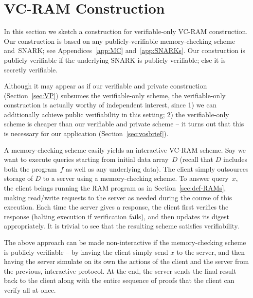 \section{VC-RAM Construction}
\label{sec:verifiableonly}
In this section we sketch a construction for verifiable-only VC-RAM construction.
Our construction is based on any publicly-verifiable memory-checking scheme and~SNARK; see
Appendices~\ref{app:MC} and~\ref{app:SNARKs}.
Our construction is publicly verifiable if the underlying SNARK is publicly verifiable;
else it is secretly verifiable.

Although it may appear as if our verifiable and private construction  
(Section~\ref{sec:VP}) subsumes the verifiable-only scheme,
the verifiable-only construction is actually  
worthy of independent interest, since 
1) we can additionally achieve public verifiability in this setting;
2) the verifiable-only scheme is cheaper than our verifiable and private
scheme -- it turns out that this is necessary 
for our \name application (Section~\ref{sec:vosbrief}). 

A memory-checking scheme easily yields an interactive VC-RAM scheme.
Say we want to execute queries starting from initial data array~$D$ (recall that $D$ includes both the
program~$f$ as well as any underlying data).
The client simply outsources storage of $D$ to a server using a memory-checking scheme.
To answer query~$x$, the client beings running the RAM program as in Section~\ref{sec:def-RAMs},
making read/write requests
to the
server as needed during the course of this execution.
Each time the server gives a response, the client first verifies the response (halting execution if
verification fails), and then updates its digest appropriately.
It is trivial to see that the resulting scheme satisfies verifiability.

The above approach can be made non-interactive if the memory-checking
scheme is publicly verifiable -- by having the client simply send
$x$ to the server, and then having the server
simulate on its own the actions of the client and the server
from the previous, interactive protocol. At the end, the server
sends the final result back to the client along with the entire sequence of proofs
that the client can verify all at once.

